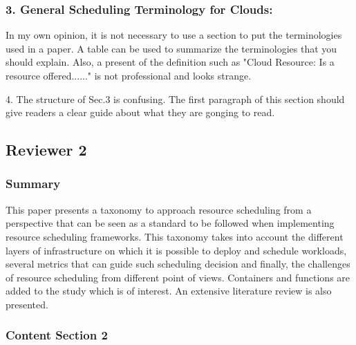 
\subsubsection{3. General Scheduling Terminology for Clouds:}

In my own opinion, it is
not necessary to use a section to put the terminologies used in a
paper. A table can be used to summarize the terminologies that you
should explain. Also, a present of the definition such as "Cloud
Resource: Is a resource offered......" is not professional and looks
strange.



4. The structure of Sec.3 is confusing. The first paragraph of this
section should give readers a clear guide about what they are gonging
to read.



\subsection{Reviewer 2}

\subsubsection{Summary}

This paper presents a taxonomy to approach resource scheduling from a
perspective that can be seen as a standard to be followed when
implementing resource scheduling frameworks. This taxonomy takes into
account the different layers of infrastructure on which it is possible
to deploy and schedule workloads, several metrics that can guide such
scheduling decision and finally, the challenges of resource scheduling
from different point of views. Containers and functions are added to
the study which is of interest. An extensive literature review is also
presented.


\subsubsection{Content Section 2}

